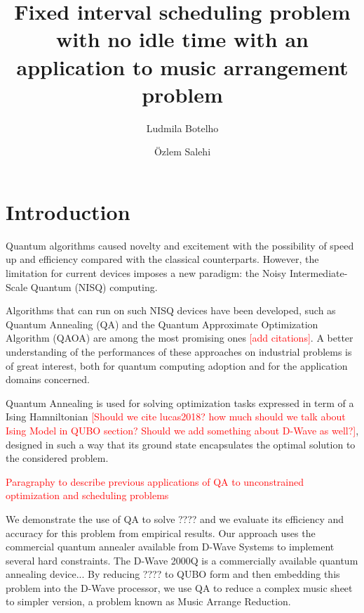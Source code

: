 \documentclass[11pt,a4paper]{article}
\title{Fixed interval scheduling problem with no idle time with an application to music arrangement problem}
\author[1,2]{Ludmila Botelho}
\author[1]{\"Ozlem Salehi}
\affil[1]{Institute of Theoretical and Applied Informatics, Polish Academy of Sciences, Bałtycka~5, 44-100 Gliwice, Poland}
\affil[2]{Joint Doctoral School, Silesian University of Technology, Akademicka 2a, 44-100 Gliwice, Poland}
\date{}
\begin{document}
	\maketitle
	\begin{abstract}

\end{abstract}







% 


\section{Introduction}

Quantum algorithms caused novelty and excitement with the possibility of speed up and efficiency compared with the classical counterparts. However, the limitation for current devices imposes a new paradigm: the Noisy Intermediate-Scale Quantum (NISQ) computing.

Algorithms that can run on such NISQ devices have been developed, such as Quantum Annealing (QA) and the Quantum Approximate Optimization Algorithm (QAOA) are among the most promising ones \textcolor{red}{[add citations]}. A better understanding of the performances of these approaches on industrial problems is of great interest, both for quantum computing adoption and for the application domains concerned. 

Quantum Annealing is used for solving optimization tasks expressed in term of a Ising Hamniltonian \textcolor{red}{[Should we cite lucas2018? how much should we talk about Ising Model in QUBO section? Should we add something about D-Wave as well?]}, designed in such a way that its ground state encapsulates the optimal solution to the considered problem.

\textcolor{red}{Paragraphy to describe previous applications of QA to unconstrained optimization and scheduling problems} \cite{ikeda2019application}


We demonstrate the use of QA to solve ???? and we evaluate its efficiency and accuracy for this problem
from empirical results. Our approach uses the commercial quantum annealer available from D-Wave Systems to
implement several hard constraints. The D-Wave 2000Q is a commercially available quantum annealing device... By reducing ???? to QUBO form and then embedding this problem into the D-Wave processor, we use QA to reduce a complex music sheet to simpler version, a problem known as Music Arrange Reduction. 
\end{document}
